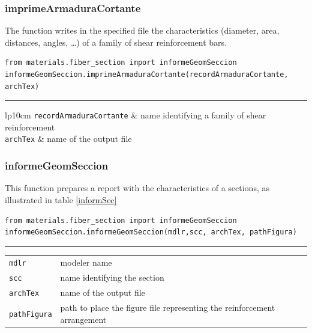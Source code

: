 \subsubsection{imprimeArmaduraCortante}
\noindent The function writes in the specified file the characteristics (diameter, area, distances, angles, \ldots) of a family of shear reinforcement bars.
\begin{verbatim}
from materials.fiber_section import informeGeomSeccion
informeGeomSeccion.imprimeArmaduraCortante(recordArmaduraCortante, archTex)
\end{verbatim}
\vspace{-10pt}
{\color{grayLines} \rule{\linewidth}{0.25pt}}
\begin{center}
\begin{tabular}{lp{10cm}}
{\tt recordArmaduraCortante} & name identifying a family of shear reinforcement \\
{\tt archTex} &  name of the output file \\
\end{tabular}
\end{center}


\subsubsection{informeGeomSeccion}
\noindent This function prepares a report with the characteristics of a sections, as illustrated in table \ref{informSec}
\begin{verbatim}
from materials.fiber_section import informeGeomSeccion
informeGeomSeccion.informeGeomSeccion(mdlr,scc, archTex, pathFigura)
\end{verbatim}
\vspace{-10pt}
{\color{grayLines} \rule{\linewidth}{0.25pt}}
\begin{center}
\begin{tabular}{lp{10cm}}
{\tt mdlr} & modeler name \\
{\tt scc} & name identifying the section \\
{\tt archTex} &  name of the output file \\
{\tt pathFigura} & path to place the figure file representing the reinforcement arrangement \\
\end{tabular}
\end{center}











